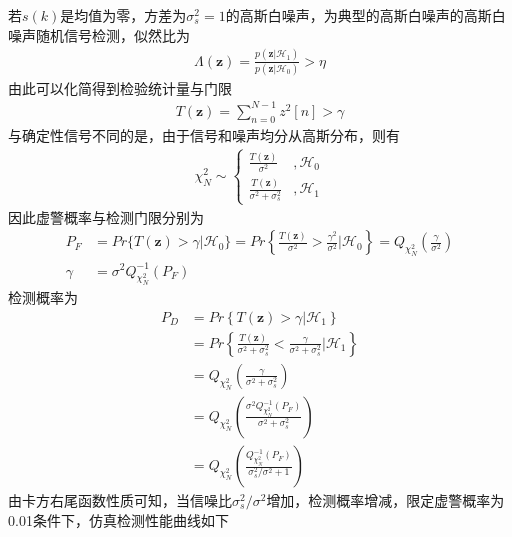 \documentclass[fontset=windows]{article}
\numberwithin{figure}{section}
\begin{document}
若\(s(k)\)是均值为零，方差为\(\sigma^2_s=1\)的高斯白噪声，为典型的高斯白噪声的高斯白噪声随机信号检测，似然比为
\begin{align*}
    \Lambda(\mathbf{z})=\frac{p(\mathbf{z}|\mathcal{H}_1)}{p(\mathbf{z}|\mathcal{H}_0)}>\eta
\end{align*}
由此可以化简得到检验统计量与门限
\begin{align*}
    T(\mathbf{z})=\sum_{n=0}^{N-1}z^2[n]>\gamma
\end{align*}
与确定性信号不同的是，由于信号和噪声均分从高斯分布，则有
\begin{align*}
    \chi^2_N\sim\left\{
    \begin{matrix}
        \frac{T(\mathbf{z})}{\sigma^2}            & , \mathcal{H}_0 \\
        \frac{T(\mathbf{z})}{\sigma^2+\sigma^2_s} & , \mathcal{H}_1
    \end{matrix}
    \right.
\end{align*}
因此虚警概率与检测门限分别为
\begin{align*}
    P_F    & =Pr\{T(\mathbf{z})>\gamma|\mathcal{H}_0\}=Pr\left\{ \frac{T(\mathbf{z})}{\sigma^2}>\frac{\gamma^2}{\sigma^2}|\mathcal{H}_0\right\}=Q_{\chi^2_N}(\frac{\gamma}{\sigma^2}) \\
    \gamma & =\sigma^2Q^{-1}_{\chi^2_N}(P_F)
\end{align*}
检测概率为
\begin{align*}
    P_D
     & =Pr\left\{T(\mathbf{z})>\gamma|\mathcal{H}_1 \right\}                                                         \\
     & =Pr\left\{\frac{T(\mathbf{z})}{\sigma^2+\sigma^2_s}<\frac{\gamma}{\sigma^2+\sigma^2_s} |\mathcal{H}_1\right\} \\
     & =Q_{\chi^2_N}\left(\frac{\gamma}{\sigma^2+\sigma^2_s}\right)                                                  \\
     & =Q_{\chi^2_N}\left(\frac{\sigma^2Q^{-1}_{\chi^2_N}(P_F)}{\sigma^2+\sigma^2_s}\right)                          \\
     & =Q_{\chi^2_N}\left(\frac{Q^{-1}_{\chi^2_N}(P_F)}{\sigma^2_s/\sigma^2+1}\right)
\end{align*}
由卡方右尾函数性质可知，当信噪比\(\sigma^2_s/\sigma^2\)增加，检测概率增减，限定虚警概率为0.01条件下，仿真检测性能曲线如下
\end{document}
